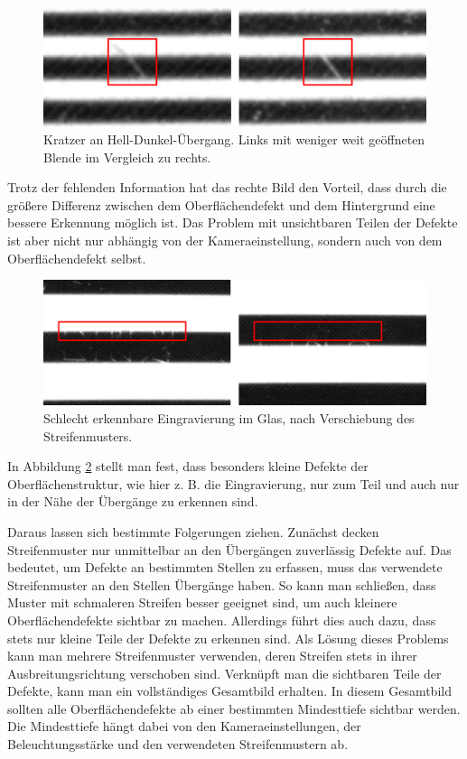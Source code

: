 \begin{figure}[H]
	\centering
	\includegraphics[width=\textwidth]{03_sichtpruefungDurchLichtreflexionen/verfahren/figures/visibleScratch}
	\caption[Kratzer]{Kratzer an Hell-Dunkel-Übergang. Links mit weniger weit geöffneten Blende im Vergleich zu rechts.}
	\label{img:scratches}
\end{figure}

\noindent
Trotz der fehlenden Information hat das rechte Bild den Vorteil, dass durch die größere Differenz zwischen dem Oberflächendefekt und dem Hintergrund eine bessere Erkennung möglich ist.
Das Problem mit unsichtbaren Teilen der Defekte ist aber nicht nur abhängig von der Kameraeinstellung, sondern auch von dem Oberflächendefekt selbst.

\begin{figure}[H]
	\centering
	\includegraphics[width=\textwidth]{03_sichtpruefungDurchLichtreflexionen/verfahren/figures/minorScratch}
	\caption[Eingravierung im Glas]{Schlecht erkennbare Eingravierung im Glas, nach Verschiebung des Streifenmusters.}
	\label{img:engraving}
\end{figure}

\noindent
In Abbildung \ref{img:engraving} stellt man fest, dass besonders kleine Defekte der Oberflächenstruktur, wie hier z. B. die Eingravierung, nur zum Teil und auch nur in der Nähe der Übergänge zu erkennen sind.

\p
Daraus lassen sich bestimmte Folgerungen ziehen.
Zunächst decken Streifenmuster nur unmittelbar an den Übergängen zuverlässig Defekte auf.
Das bedeutet, um Defekte an bestimmten Stellen zu erfassen, muss das verwendete Streifenmuster an den Stellen Übergän\-ge haben.
So kann man schließen, dass Muster mit schmaleren Streifen besser geeignet sind, um auch kleinere Oberflächendefekte sichtbar zu machen.
Allerdings führt dies auch dazu, dass stets nur kleine Teile der Defekte zu erkennen sind.
Als Lösung dieses Problems kann man mehrere Streifenmuster verwenden, deren Streifen stets in ihrer Ausbreitungsrichtung verschoben sind.
Verknüpft man die sichtbaren Teile der Defekte, kann man ein vollständiges Gesamtbild erhalten.
In diesem Gesamtbild sollten alle Oberflächendefekte ab einer bestimmten Mindesttiefe sichtbar werden.
Die Mindesttiefe hängt dabei von den Kameraeinstellungen, der Beleuchtungsstärke und den verwendeten Streifenmustern ab.